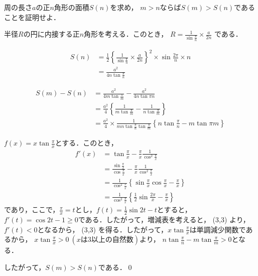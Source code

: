 
\begin{problem}
  周の長さ$a$の正$n$角形の面積$S(n)$を求め，
$m>n$ならば$S(m)>S(n)$であることを証明せよ．
\end{problem}

半径$R$の円に内接する正$n$角形を考える．このとき，
$R = \frac{1}{\sin \frac{\pi}n} \times \frac{a}{2n}$
である．

\begin{align*}
  S(n) &= \frac12 \left\{ \frac{1}{\sin \frac{\pi}n} \times \frac{a}{2n} \right\}^2 \times \sin \frac{2\pi}n \times n \\
  &= \frac{a^2}{4n \tan \frac{\pi}{n}}
\end{align*}

\begin{align*}
  S(m)-S(n) &= \frac{a^2}{4m\tan\frac{\pi}m} - \frac{a^2}{4n\tan{\pi}n} \\
  &= \frac{a^2}4 \left\{ \frac{1}{m\tan\frac{\pi}m} - \frac{1}{n\tan\frac{\pi}m} \right\} \\
  &= \frac{a^2}4 \times \frac{1}{mn \tan\frac{\pi}n \tan\frac{\pi}m}
  \left\{ n\tan\frac{\pi}{n} - m\tan{\pi}{m} \right\}
\end{align*}

$f(x) = x \tan\frac{\pi}x$とする．このとき，
\begin{align*}
  f'(x) &= \tan\frac{\pi}x - \frac{\pi}x \frac{1}{\cos^2 \frac{\pi}x} \\
  &= \frac{\sin \frac{\pi}x}{\cos \frac{\pi}x} - \frac{\pi}x \frac{1}{\cos^2 \frac{\pi}x} \\
  &= \frac{1}{\cos^2 \frac{\pi}x} \left\{ \sin \frac{\pi}x \cos \frac{\pi}x - \frac{\pi}x \right\} \\
  &= \frac{1}{\cos^2 \frac{\pi}x} \left\{ \frac12 \sin\frac{2\pi}x - \frac{\pi}x \right\}
\end{align*}
であり，ここで，$\frac\pi{x} = t$とし，$f(t) = \frac12 \sin 2t - t$とすると，
$f'(t) = \cos 2t - 1 \geq 0$である．したがって，増減表を考えると，
\RESETKEYA
{}
\zogen(3,3)
より，$f'(t) < 0$となるから，
\RESETKEYA
{}
\zogen(3,3)
を得る．したがって，$x\tan\frac{\pi}x$は単調減少関数であるから，
$x \tan\frac{\pi}x > 0 \ (x \text{は} 3\text{以上の自然数})$より，
$n \tan \frac{\pi}n - m\tan\frac{\pi}m > 0$となる．

したがって，$S(m) > S(n)$である．\qed

